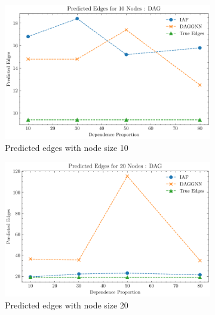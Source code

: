 \documentclass[10pt]{article}
\begin{document}
\begin{figure}
    \centering
    \begin{subfigure}{0.45\textwidth}
        \includegraphics[width=\textwidth]{fig/Predicted Edges_dependence_10_DAG_threshold0.3.pdf}
        \caption{Predicted edges with node size 10}
        \label{pred_edge_node10}
    \end{subfigure}
    \hfill
    \begin{subfigure}{0.45\textwidth}
        \includegraphics[width=\textwidth]{fig/Predicted Edges_dependence_20_DAG_threshold0.3.pdf}
        \caption{Predicted edges with node size 20}
        \label{pred_edge_node20}
    \end{subfigure}
    \begin{subfigure}{0.45\textwidth}

\end{subfigure}
\end{figure}
\end{document}
